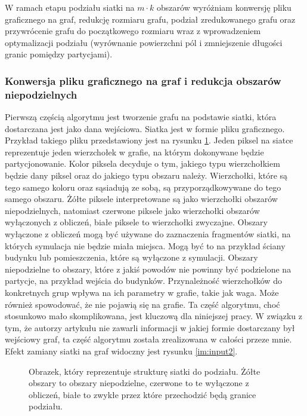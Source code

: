 W ramach etapu podziału siatki na $m \cdot k$ obszarów wyróżniam konwersję pliku graficznego na graf, redukcję rozmiaru grafu,
podział zredukowanego grafu oraz przywrócenie grafu do początkowego rozmiaru wraz z wprowadzeniem optymalizacji podziału
(wyrównanie powierzchni pól i zmniejszenie długości granic pomiędzy partycjami).

\subsubsection{Konwersja pliku graficznego na graf i redukcja obszarów niepodzielnych}

Pierwszą częścią algorytmu jest tworzenie grafu na podstawie siatki, która dostarczana jest jako dana wejściowa.
Siatka jest w formie pliku graficznego.
Przykład takiego pliku przedstawiony jest na rysunku \ref{im:input}.
Jeden piksel na siatce reprezentuje jeden wierzchołek w grafie, na którym dokonywane będzie partycjonowanie.
Kolor piksela decyduje o tym, jakiego typu wierzchołkiem będzie dany piksel oraz do jakiego typu obszaru należy.
Wierzchołki, które są tego samego koloru oraz sąsiadują ze sobą, są przyporządkowywane do tego samego obszaru.
Żółte piksele interpretowane są jako wierzchołki obszarów niepodzielnych, natomiast czerwone piksele
jako wierzchołki obszarów wyłączonych z obliczeń, białe piksele to wierzchołki zwyczajne.
Obszary wyłączone z obliczeń mogą być używane do zaznaczenia fragmentów siatki, na których symulacja
nie będzie miała miejsca.
Mogą być to na przykład ściany budynku lub pomieszczenia, które są wyłączone z symulacji.
Obszary niepodzielne to obszary, które z jakiś powodów nie powinny być podzielone na partycje,
na przykład wejścia do budynków.
Przynależność wierzchołków do konkretnych grup wpływa na ich parametry w grafie, takie jak waga.
Może również spowodować, że nie pojawią się na grafie.
Ta część algorytmu, choć stosunkowo mało skomplikowana, jest kluczową dla niniejszej pracy.
W związku z tym, że autorzy artykułu \cite{1364754} nie zawarli informacji w jakiej formie dostarczany był
wejściowy graf, ta część algorytmu została zrealizowana w całości przeze mnie.
Efekt zamiany siatki na graf widoczny jest rysunku \ref{im:input2}.

\begin{figure}[h]
    \centering
    \caption{Obrazek, który reprezentuje strukturę siatki do podziału. Żółte obszary to obszary niepodzielne, czerwone to
    te wyłączone z obliczeń, białe to zwykłe przez które przechodzić będą granice podziału.}
    \label{im:input}
\end{figure}

